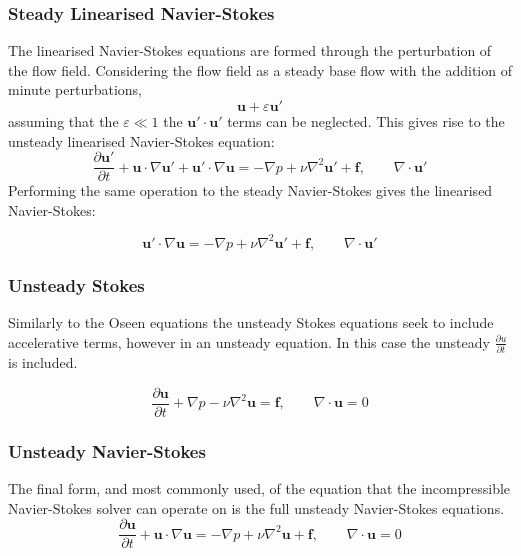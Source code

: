 \documentclass[11pt, a4paper]{report}
\begin{document}
\subsubsection{Steady Linearised Navier-Stokes}
The linearised Navier-Stokes equations are formed through the perturbation of the flow field. Considering the flow field as a steady base flow with the addition of minute perturbations,
\begin{equation}
\mathbf{u} + \varepsilon \mathbf{u'}
\end{equation}
assuming that the $\varepsilon \ll 1$ the $\mathbf{u'} \cdot \mathbf{u'}$ terms can be neglected. This gives rise to the unsteady linearised Navier-Stokes equation:
\begin{equation}
\frac{\partial \mathbf{u'}}{\partial t} + \mathbf{u} \cdot \nabla \mathbf{u'} + \mathbf{u'} \cdot \nabla \mathbf{u} = - \nabla p + \nu  \nabla^{2} \mathbf{u'} + \mathbf{f}, \qquad \nabla \cdot \mathbf{u'}
\label{eq:UnsteadyLinearisedNS}
\end{equation}
Performing the same operation to the steady Navier-Stokes gives the linearised Navier-Stokes:

\begin{equation}
\mathbf{u'} \cdot \nabla \mathbf{u} = - \nabla p + \nu  \nabla^{2} \mathbf{u'} + \mathbf{f}, \qquad \nabla \cdot \mathbf{u'}
\label{eq:SteadyLinearisedNS}
\end{equation}

\subsubsection{Unsteady Stokes}
Similarly to the Oseen equations the unsteady Stokes equations seek to include accelerative terms, however in an unsteady equation. In this case the unsteady $\frac{\partial u}{\partial t}$ is included.

\begin{equation}
\frac{\partial \mathbf{u}}{\partial t} + \nabla p - \nu \nabla^{2} \mathbf{u} = \mathbf{f}, \qquad \nabla \cdot \mathbf{u} = 0
\label{eq:UnsteadyStokes}
\end{equation}

\subsubsection{Unsteady Navier-Stokes}
The final form, and most commonly used, of the equation that the incompressible Navier-Stokes solver can operate on is the full unsteady Navier-Stokes equations.
\begin{equation*}
\frac{\partial \mathbf{u}}{\partial t} + \mathbf{u} \cdot \nabla \mathbf{u} = - \nabla p + \nu \nabla^{2} \mathbf{u} + \mathbf{f}, \qquad \nabla \cdot \mathbf{u} = 0
\end{equation*}
		
\end{document}
